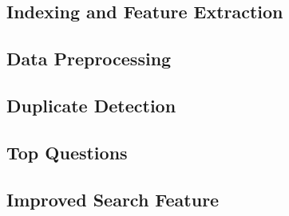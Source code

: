 \documentclass[sigconf]{acmart}
\begin{document}
\subsection{Indexing and Feature Extraction}


\subsection{Data Preprocessing}

\subsection{Duplicate Detection}

\subsection{Top Questions}
\subsection{Improved Search Feature}



 
\end{document}
